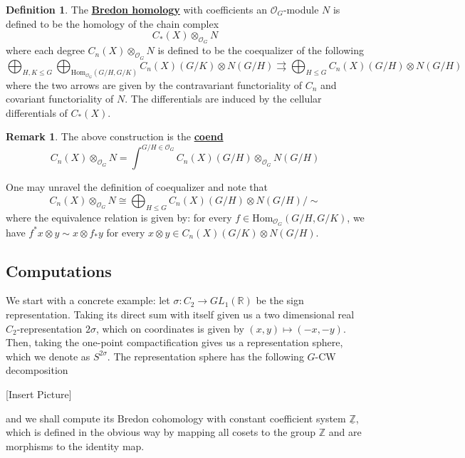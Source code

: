 \documentclass{article}
\theoremstyle{definition}
\theoremstyle{definition}
\newtheorem{definition}{Definition}[theorem]
\theoremstyle{definition}
\newtheorem{remark}{Remark}[theorem]
\theoremstyle{definition}
\theoremstyle{definition}
\theoremstyle{definition}
\theoremstyle{definition}
\begin{document}
\begin{tcolorbox}[colback=purple!5!white,colframe=purple!75!black]
\begin{definition}
The \underline{\textbf{Bredon homology}} with coefficients an $\mathcal{O}_G$-module $N$ is defined to be the homology of the chain complex 
\[C_*(X)\otimes_{\mathcal{O}_G} N\]
where each degree $C_n(X)\otimes_{\mathcal{O}_G} N$ is defined to be the coequalizer of the following
\[ \bigoplus_{H,K\leq G}\bigoplus_{\textrm{Hom}_{\mathcal{O}_G}(G/H,G/K)}C_n(X)(G/K)\otimes N(G/H)\rightrightarrows \bigoplus_{H\leq G}C_n(X)(G/H)\otimes N(G/H) \]
where the two arrows are given by the contravariant functoriality of $C_n$ and covariant functoriality of $N$. The differentials are induced by the cellular differentials of $C_*(X)$.

\end{definition}
\end{tcolorbox}


\begin{tcolorbox}[colback=green!5!white,colframe=green!30!white]
\begin{remark}
The above construction is the \underline{\textbf{coend}}
\[C_n(X)\otimes_{\mathcal{O}_G} N=\int^{G/H\in \mathcal{O}_G}C_n(X)(G/H)\otimes_{\mathcal{O}_G} N(G/H)\]
\end{remark}
\end{tcolorbox}
One may unravel the definition of coequalizer and note that 
\[C_n(X)\otimes_{\mathcal{O}_G} N\cong \bigoplus_{H\leq G}C_n(X)(G/H)\otimes N(G/H)/\sim\]
where the equivalence relation is given by: for every $f\in \textrm{Hom}_{\mathcal{O}_G}(G/H,G/K)$, we have $f^*x\otimes y\sim x\otimes f_*y$ for every $x\otimes y\in C_n(X)(G/K)\otimes N(G/H)$.

\subsection{Computations}
We start with a concrete example: let $\sigma: C_2\to GL_1(\mathbb{R})$ be the sign representation. Taking its direct sum with itself given us a two dimensional real $C_2$-representation $2\sigma$, which on coordinates is given by $(x,y)\mapsto (-x,-y)$. Then, taking the one-point compactification gives us a representation sphere, which we denote as $S^{2\sigma}$. The representation sphere has the following $G$-CW decomposition 

[Insert Picture]

and we shall compute its Bredon cohomology with constant coefficient system $\underline{\mathbb{Z}}$, which is defined in the obvious way by mapping all cosets to the group $\mathbb{Z}$ and are morphisms to the identity map. 
\end{document}
